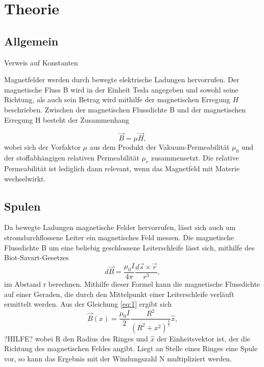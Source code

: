 \section{Theorie}
\label{sec:Theorie}


\subsection{Allgemein}
Verweis auf Konstanten

Magnetfelder werden durch bewegte elektrische Ladungen hervorrufen. Der magnetische Fluss B wird in der Einheit Tesla 
angegeben und sowohl seine Richtung, als auch sein Betrag wird mithilfe der magnetischen Erregung $H$ beschrieben.
Zwischen der magnetischen Flussdichte B und der magnetischen Erregung H besteht der Zusammenhang

\begin{equation}
    \vec B = \mu \vec H,
\end{equation}
\noindent
wobei sich der Vorfaktor $\mu$ aus dem Produkt der Vakuum-Permeabilität $\mu_0$ und der stoffabhängigen relativen
Permeabilität $\mu_r$ zusammensetzt. Die relative Permeabilität ist lediglich dann relevant, wenn das Magnetfeld mit Materie 
wechselwirkt.


\subsection{Spulen}

Da bewegte Ladungen magnetische Felder hervorrufen, lässt sich auch um stromdurchflossene Leiter ein 
magnetisches Feld messen. Die magnetische Flussdichte B um eine beliebig geschlossene 
Leiterschleife lässt sich, mithilfe des Biot-Savart-Gesetzes
\begin{equation}
    d\vec B = \frac{\mu_0 I}{4 \pi} \frac{d\vec s \times \vec r}{r^3},
    \label{eq:2} 
\end{equation}
\noindent
im Abstand r berechnen. Mithilfe dieser Formel kann die magnetische Flussdichte auf einer Geraden, die durch den 
Mittelpunkt einer Leiterschleife verläuft ermittelt werden. Aus der Gleichung \ref{eq:1} ergibt sich 
\begin{equation}
    \vec B (x) = \frac{\mu_0 I}{2} \frac{R^2}{(R^2+x^2)^\frac{3}{2}} \hat{x},
\end{equation}
\noindent
?HILFE?
wobei R den Radius des Ringes und $\hat{x}$ der Einheitsvektor ist, der die Richtung des magnetischen Feldes angibt.
Liegt an Stelle eines Ringes eine Spule vor, so kann das Ergebnis mit der Windungszahl N multipliziert werden.

